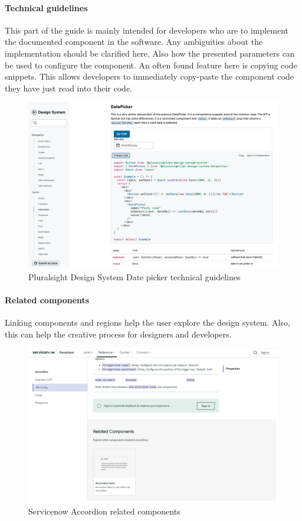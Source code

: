 \paragraph*{Technical guidelines} \label{tech_guideline}
This part of the guide is mainly intended for developers who are to implement the documented component in the software. Any ambiguities about the implementation should be clarified here. Also how the presented parameters can be used to configure the component. An often found feature here is copying code snippets. This allows developers to immediately copy-paste the component code they have just read into their code.  \cite{macdonald_practical_2019} \cite{vesselov_building_2019}
\begin{figure}[htbp]
\centerline{\includegraphics[width=\linewidth]{images/pluralsight_date-picker_technical.png}}
\caption{Pluralsight Design System Date picker technical guidelines \cite{pluralsight_datepicker_nodate}}
\label{fiori_action_list}
\end{figure}
\paragraph*{Related components} Linking components and regions help the user explore the design system. Also, this can help the creative process for designers and developers.  \cite{vesselov_building_2019}
\begin{figure}[htbp]
\centerline{\includegraphics[width=\linewidth]{images/servicenow_accordion_related.png}}
\caption{Servicenow Accordion related components \cite{servicenow_now_nodate}}
\label{fiori_action_list}
\end{figure}

